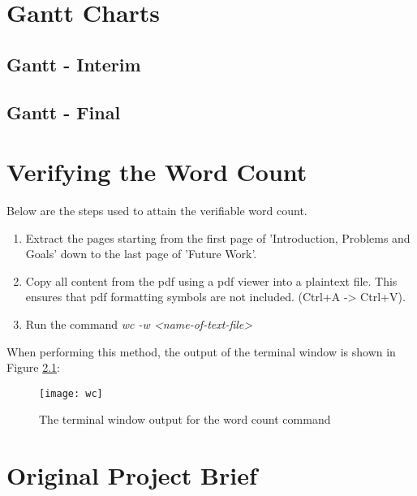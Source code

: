 \chapter{Gantt Charts}
\newpage
\section{Gantt - Interim} \label{gc-interim}
\begin{center}
\end{center}

\section{Gantt - Final} \label{gc-final}
\begin{center}
\end{center}

\chapter{Verifying the Word Count}
Below are the steps used to attain the verifiable word count.
\begin{enumerate}
	\item Extract the pages starting from the first page of 'Introduction, Problems and Goals' down to the last page of 'Future Work'.
	\item Copy all content from the pdf using a pdf viewer into a plaintext file. This ensures that pdf formatting symbols are not included. (Ctrl+A -> Ctrl+V).
	\item Run the command \emph{wc -w <name-of-text-file>}
\end{enumerate}

When performing this method, the output of the terminal window is shown in Figure \ref{wc}:\\

\begin{figure}[H]
	\centering
	\texttt{[image: wc]}
	\caption{The terminal window output for the word count command} \label{wc}
\end{figure}

\chapter{Original Project Brief}
